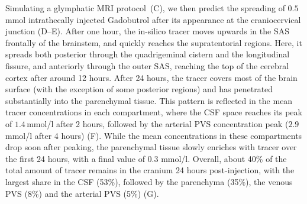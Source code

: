 \documentclass[fleqn,10pt]{wlscirep}
\begin{document}
Simulating a glymphatic MRI protocol~\cite{ringstad2017glymphatic,
  ringstad2018brain, eide2024functional}(C), we then predict the
spreading of $0.5$ mmol intrathecally injected Gadobutrol after its
appearance at the craniocervical junction
(D--E). After one hour, the in-silico
tracer moves upwards in the SAS frontally of the brainstem, and
quickly reaches the supratentorial regions. Here, it spreads both
posterior through the quadrigeminal cistern and the longitudinal
fissure, and anteriorly through the outer SAS, reaching the top of the
cerebral cortex after around 12 hours. After 24 hours, the tracer
covers most of the brain surface (with the exception of some posterior
regions) and has penetrated substantially into the parenchymal
tissue. This pattern is reflected in the mean tracer concentrations in
each compartment, where the CSF space reaches its peak of
$1.4\,$mmol/l after 2 hours, followed by the arterial PVS
concentration peak ($2.9\,$mmol/l after 4 hours)
(F). While the mean concentrations in these
compartments drop soon after peaking, the parenchymal tissue
slowly enriches with tracer over the first 24 hours, with a final
value of $0.3$ mmol/l. Overall, about 40\% of the total amount of
tracer remains in the cranium 24 hours post-injection, with the largest
share in the CSF (53\%), followed by the parenchyma (35\%), the
venous PVS (8\%) and the arterial PVS
(5\%) (G).
\end{document}

